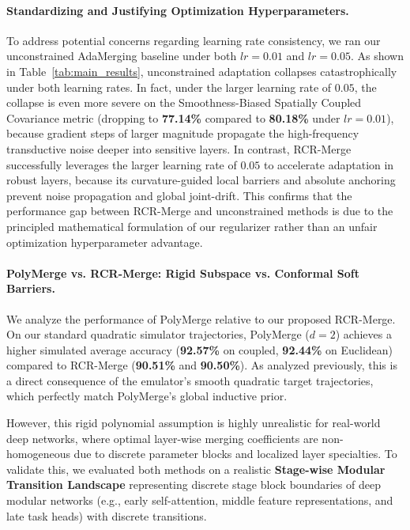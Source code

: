 \paragraph{Standardizing and Justifying Optimization Hyperparameters.}
To address potential concerns regarding learning rate consistency, we ran our unconstrained AdaMerging baseline under both $lr=0.01$ and $lr=0.05$. As shown in Table~\ref{tab:main_results}, unconstrained adaptation collapses catastrophically under both learning rates. In fact, under the larger learning rate of $0.05$, the collapse is even more severe on the Smoothness-Biased Spatially Coupled Covariance metric (dropping to \textbf{77.14\%} compared to \textbf{80.18\%} under $lr=0.01$), because gradient steps of larger magnitude propagate the high-frequency transductive noise deeper into sensitive layers. In contrast, RCR-Merge successfully leverages the larger learning rate of $0.05$ to accelerate adaptation in robust layers, because its curvature-guided local barriers and absolute anchoring prevent noise propagation and global joint-drift. This confirms that the performance gap between RCR-Merge and unconstrained methods is due to the principled mathematical formulation of our regularizer rather than an unfair optimization hyperparameter advantage.

\paragraph{PolyMerge vs. RCR-Merge: Rigid Subspace vs. Conformal Soft Barriers.}
We analyze the performance of PolyMerge relative to our proposed RCR-Merge. On our standard quadratic simulator trajectories, PolyMerge ($d=2$) achieves a higher simulated average accuracy (\textbf{92.57\%} on coupled, \textbf{92.44\%} on Euclidean) compared to RCR-Merge (\textbf{90.51\%} and \textbf{90.50\%}). As analyzed previously, this is a direct consequence of the emulator's smooth quadratic target trajectories, which perfectly match PolyMerge's global inductive prior.

However, this rigid polynomial assumption is highly unrealistic for real-world deep networks, where optimal layer-wise merging coefficients are non-homogeneous due to discrete parameter blocks and localized layer specialties. To validate this, we evaluated both methods on a realistic \textbf{Stage-wise Modular Transition Landscape} representing discrete stage block boundaries of deep modular networks (e.g., early self-attention, middle feature representations, and late task heads) with discrete transitions.

